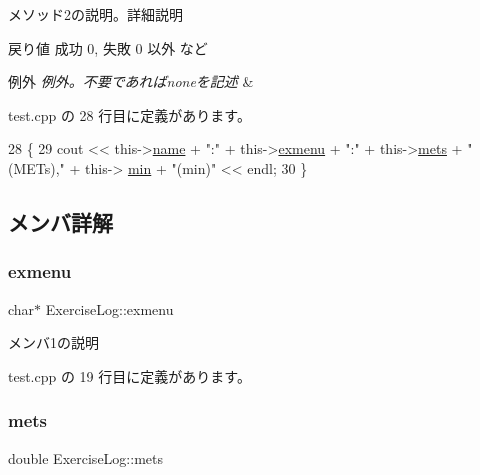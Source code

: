 メソッド2の説明。詳細説明 \begin{DoxyReturn}{戻り値}
成功 0, 失敗 0 以外 など 
\end{DoxyReturn}

\begin{DoxyExceptions}{例外}
{\em 例外。不要であればnoneを記述} & \\
\hline
\end{DoxyExceptions}


 test.\+cpp の 28 行目に定義があります。


\begin{DoxyCode}
28                 \{
29         cout << this->\hyperlink{class_list_item_a721391bcdefb1a5f77b79295a80b0305}{name} + \textcolor{stringliteral}{":"} +  this->\hyperlink{class_exercise_log_aa7d8e7d8b226d049d279912b9fc0fd5b}{exmenu} + \textcolor{stringliteral}{":"} + this->\hyperlink{class_exercise_log_a511c5c637f86192270d0588fd7b0c5ee}{mets} + \textcolor{stringliteral}{"(METs),"} +  this->
      \hyperlink{class_exercise_log_a9fc8d465bb5d443970799bafd82441a4}{min} + \textcolor{stringliteral}{"(min)"} << endl;
30     \}
\end{DoxyCode}


\subsection{メンバ詳解}
\mbox{\label{class_exercise_log_aa7d8e7d8b226d049d279912b9fc0fd5b}} 
\subsubsection{\texorpdfstring{exmenu}{exmenu}}
{\footnotesize\ttfamily char$\ast$ Exercise\+Log\+::exmenu\hspace{0.3cm}{\ttfamily [private]}}

メンバ1の説明 

 test.\+cpp の 19 行目に定義があります。

\mbox{\label{class_exercise_log_a511c5c637f86192270d0588fd7b0c5ee}} 
\subsubsection{\texorpdfstring{mets}{mets}}
{\footnotesize\ttfamily double Exercise\+Log\+::mets\hspace{0.3cm}{\ttfamily [private]}}

